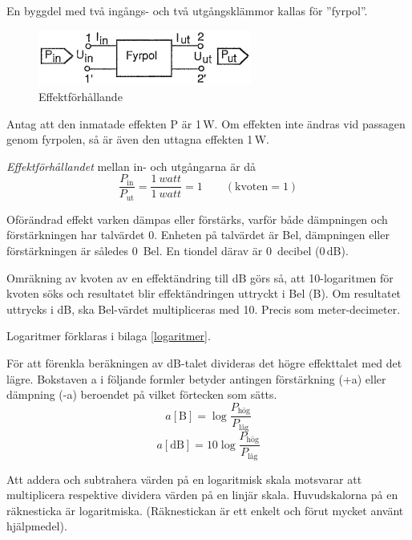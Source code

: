En byggdel med två ingångs- och två utgångsklämmor kallas för ''fyrpol''.

\begin{figure}[ht]
	\centering
	\includegraphics[width=7cm]{images/cropped_pdfs/bild_2_1-32.pdf}
	\caption{Effektförhållande}
	\label{fig:BildII1-32}
\end{figure}

Antag att den inmatade effekten P är 1\,W.
Om effekten inte ändras vid passagen genom fyrpolen, så är även den uttagna
effekten 1\,W.

\emph{Effektförhållandet} mellan in- och utgångarna är då
\begin{equation*}
	\frac{P_{\mathrm{in}}}{P_{\mathrm{ut}}} = 
	\frac{\SI{1}{watt}}{\SI{1}{watt}} = 1 \qquad (\mathrm{kvoten} = 1)
\end{equation*}

Oförändrad effekt varken dämpas eller förstärks, varför både dämpningen och
förstärkningen har talvärdet 0.
Enheten på talvärdet är Bel, dämpningen eller förstärkningen är således 0~Bel.
En tiondel därav är 0~decibel (0\,dB).

Omräkning av kvoten av en effektändring till dB görs så, att 10-logaritmen för
kvoten söks och resultatet blir effektändringen uttryckt i Bel (B). Om
resultatet uttrycks i dB, ska Bel-värdet multipliceras med 10. Precis som meter-decimeter.

Logaritmer förklaras i bilaga \ref{logaritmer}.

För att förenkla beräkningen av dB-talet divideras det högre effekttalet med det
lägre. Bokstaven a i följande formler betyder antingen förstärkning (+a) eller
dämpning (-a) beroendet på vilket förtecken som sätts.
\begin{equation*}
	a\mathrm{[B]} = \log \dfrac{P_\text{hög}}{P_\text{låg}}
\end{equation*}
\begin{equation*}
	a\mathrm{[dB]} = 10\log \dfrac{P_\text{hög}}{P_\text{låg}}
\end{equation*}

Att addera och subtrahera värden på en logaritmisk skala motsvarar att
multiplicera respektive dividera värden på en linjär skala.
Huvudskalorna på en räknesticka är logaritmiska.
(Räknestickan är ett enkelt och förut mycket använt hjälpmedel).

